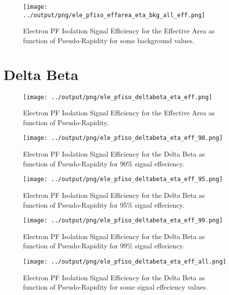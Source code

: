 \documentclass[11pt]{book}
\begin{document}
\begin{figure}[htb]
\centering
\texttt{[image: ../output/png/ele\_pfiso\_effarea\_eta\_bkg\_all\_eff.png]}
\caption{Electron PF Isolation Signal Efficiency for the Effective Area as function of Pseudo-Rapidity for some background values.}
\label{fig:ele_pfiso_eta_bkg_effarea_bkg_all_eff}
\end{figure}
\clearpage

\section{Delta Beta}
\begin{figure}[htb]
\centering
\texttt{[image: ../output/png/ele\_pfiso\_deltabeta\_eta\_eff.png]}
\caption{Electron PF Isolation Signal Efficiency for the Effective Area as function of Pseudo-Rapidity.}
\label{fig:ele_pfiso_eta_eff_deltabeta}
\end{figure}

\begin{figure}[htb]
\centering
\texttt{[image: ../output/png/ele\_pfiso\_deltabeta\_eta\_eff\_90.png]}
\caption{Electron PF Isolation Signal Efficiency for the Delta Beta as function of Pseudo-Rapidity for 90\% signal effeciency.}
\label{fig:ele_pfiso_eta_eff_deltabeta_eff_90}
\end{figure}

\begin{figure}[htb]
\centering
\texttt{[image: ../output/png/ele\_pfiso\_deltabeta\_eta\_eff\_95.png]}
\caption{Electron PF Isolation Signal Efficiency for the Delta Beta as function of Pseudo-Rapidity for 95\% signal effeciency.}
\label{fig:ele_pfiso_eta_eff_deltabeta_eff_95}
\end{figure}

\begin{figure}[htb]
\centering
\texttt{[image: ../output/png/ele\_pfiso\_deltabeta\_eta\_eff\_99.png]}
\caption{Electron PF Isolation Signal Efficiency for the Delta Beta as function of Pseudo-Rapidity for 99\% signal effeciency.}
\label{fig:ele_pfiso_eta_eff_deltabeta_eff_99}
\end{figure}

\begin{figure}[htb]
\centering
\texttt{[image: ../output/png/ele\_pfiso\_deltabeta\_eta\_eff\_all.png]}
\caption{Electron PF Isolation Signal Efficiency for the Delta Beta as function of Pseudo-Rapidity for some signal effeciency values.}
\label{fig:ele_pfiso_eta_eff_deltabeta_eff_all}
\end{figure}
\clearpage
\end{document}

